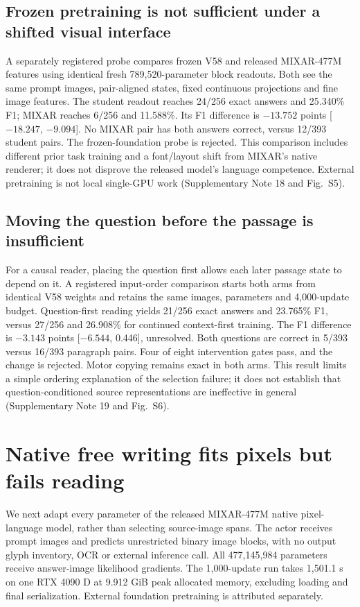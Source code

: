 \documentclass[12pt,a4paper]{article}
\begin{document}
\subsection*{Frozen pretraining is not sufficient under a shifted visual interface}
A separately registered probe compares frozen V58 and released MIXAR-477M\cite{mixar}
features using identical fresh 789,520-parameter block readouts. Both see
the same prompt images, pair-aligned states, fixed continuous projections and
fine image features. The student readout reaches 24/256 exact answers and
25.340\% F1; MIXAR reaches 6/256 and 11.588\%. Its F1 difference is
$-13.752$ points [$-18.247$, $-9.094$]. No MIXAR pair has both answers correct,
versus 12/393 student pairs. The frozen-foundation probe is rejected.
This comparison includes different prior task training and a font/layout
shift from MIXAR's native renderer; it does not disprove the released model's
language competence. External pretraining is not local single-GPU work
(Supplementary Note 18 and Fig.~S5).

\subsection*{Moving the question before the passage is insufficient}
For a causal reader, placing the question first allows each later passage
state to depend on it. A registered input-order comparison starts both arms
from identical V58 weights and retains the same images, parameters and
4,000-update budget. Question-first reading yields 21/256 exact answers and
23.765\% F1, versus 27/256 and 26.908\% for continued context-first training.
The F1 difference is $-3.143$ points [$-6.544$, 0.446], unresolved. Both
questions are correct in 5/393 versus 16/393 paragraph pairs. Four of eight
intervention gates pass, and the change is rejected. Motor copying remains
exact in both arms. This result limits a simple ordering explanation of the
selection failure; it does not establish that question-conditioned source
representations are ineffective in general (Supplementary Note 19 and Fig.~S6).

\section*{Native free writing fits pixels but fails reading}
We next adapt every parameter of the released MIXAR-477M native
pixel-language model\cite{mixar}, rather than selecting source-image spans.
The actor receives prompt images and predicts unrestricted binary image
blocks, with no output glyph inventory, OCR or external inference call.
All 477,145,984 parameters receive answer-image likelihood gradients.
The 1,000-update run takes 1,501.1 s on one RTX 4090 D at 9.912 GiB peak
allocated memory, excluding loading and final serialization. External
foundation pretraining is attributed separately.
\end{document}
